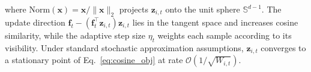 where $\mathrm{Norm}(\mathbf{x})=\mathbf{x}/\|\mathbf{x}\|_2$ projects $\mathbf{z}_{i,t}$ onto the unit sphere $\mathbb{S}^{d-1}$.
The update direction $\mathbf{f}_t-(\mathbf{f}_t^\top \mathbf{z}_{i,t})\mathbf{z}_{i,t}$ lies in the tangent space and increases cosine similarity, while the adaptive step size $\eta_t$ weights each sample according to its visibility.
Under standard stochastic approximation assumptions, $\mathbf{z}_{i,t}$ converges to a stationary point of Eq.~\eqref{eq:cosine_obj} at rate $\mathcal{O}(1/\sqrt{W_{i,t}})$.

